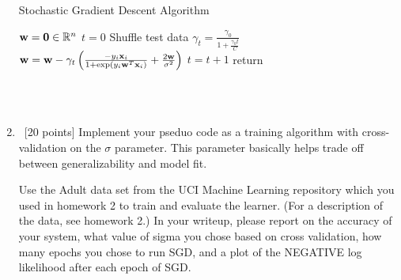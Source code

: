 \begin{enumerate}
\begin{minipage}{\linewidth}
  \begin{algorithm}[H]
    \caption{Stochastic Gradient Descent Algorithm}\label{AlgSGD}
    \begin{algorithmic}[1]
        \State ${\bf w} = \textbf{0} \in \mathbb{R}^n$
        \State $t = 0$
	        \State Shuffle test data
			\State  $\gamma_t  = \frac{\gamma_0}{1+ \frac{\gamma_0 t}{C}}$
			\State ${\bf w} = {\bf w} -  \gamma_t \left (\frac{-y_i {\bf x}_i}{1+ \exp(y_i{\bf w}^T{\bf x}_i)} + \frac{2{\bf w}}{\sigma^2} \right )$
			\State $ t = t+1$
          	\EndFor
	\EndFor
      \State return \bw
      \EndProcedure
    \end{algorithmic}
  \end{algorithm}
\end{minipage}\\\\

\item ~[20 points] Implement your pseduo code as a training algorithm with
  cross-validation on the $\sigma$ parameter.  This parameter
  basically helps trade off between generalizability and model fit.  

  Use the Adult data set from the UCI Machine Learning repository which you used in homework 2 to train and evaluate the learner. (For a description of the data, see homework 2.) In your writeup,
  please report on the accuracy of your system, what value of sigma
  you chose based on cross validation, how many epochs you chose to
  run SGD, and a plot of the NEGATIVE log likelihood after each epoch
  of SGD.



\end{enumerate}




